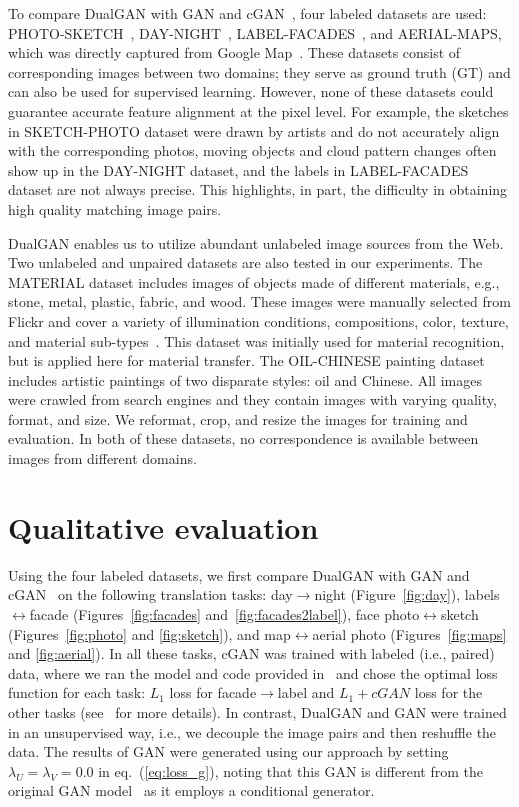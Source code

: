 To compare DualGAN with GAN and cGAN~\cite{isola2016image}, four labeled datasets are used: 
PHOTO-SKETCH~\cite{wang2009face,zhang2011coupled}, DAY-NIGHT~\cite{laffont2014transient}, 
LABEL-FACADES~\cite{tylevcek2013spatial}, and AERIAL-MAPS, which was directly captured from 
Google Map~\cite{isola2016image}. These datasets consist of corresponding images between two 
domains; they serve as ground truth (GT) and can also be used for supervised learning. However, none of these datasets could guarantee accurate feature alignment at the pixel level. For example, 
the sketches in SKETCH-PHOTO dataset were drawn by artists and do not accurately align with the 
corresponding photos, moving objects and cloud pattern changes often show up in the DAY-NIGHT dataset, 
and the labels in LABEL-FACADES dataset are not always precise. This highlights, in part, the difficulty in 
obtaining high quality matching image pairs.

DualGAN enables us to utilize abundant unlabeled image sources from the Web. Two unlabeled and 
unpaired datasets are also tested in our experiments. The MATERIAL dataset includes images of objects made of 
different materials, e.g., stone, metal, plastic, fabric, and wood. These images were manually selected from 
Flickr and cover a variety of illumination conditions, compositions, color, texture, and material 
sub-types~\cite{sharan2009material}. This dataset was initially used for material recognition, but is applied 
here for material transfer. The OIL-CHINESE painting dataset includes artistic paintings of two disparate styles: 
oil and Chinese. All images were crawled from search engines and they contain images with varying 
quality, format, and size. We reformat, crop, and resize the images for training and evaluation.
In both of these datasets, no correspondence is available between images from different domains.

\section{Qualitative evaluation}

Using the four labeled datasets, we first compare DualGAN with GAN and cGAN~\cite{isola2016image} on the 
following translation tasks: day$\rightarrow$night (Figure~\ref{fig:day}), labels$\leftrightarrow$facade 
(Figures~\ref{fig:facades} and~\ref{fig:facades2label}), face photo$\leftrightarrow$sketch (Figures~\ref{fig:photo} 
and \ref{fig:sketch}), and map$\leftrightarrow$aerial photo (Figures~\ref{fig:maps} and \ref{fig:aerial}). 
In all these tasks, cGAN was trained with labeled (i.e., paired) data, where we ran the model and code provided 
in~\cite{isola2016image} and chose the optimal loss function for each task: $L_1$ loss for facade$\rightarrow$label 
and $L_1+cGAN$ loss for the other tasks (see~\cite{isola2016image} for more details). In contrast, DualGAN and 
GAN were trained in an unsupervised way, i.e., we decouple the image pairs and then reshuffle the data. The 
results of GAN were generated using our approach by setting $\lambda_U=\lambda_V = 0.0$ in eq.~(\ref{eq:loss_g}), 
noting that this GAN is different from the original GAN model~\cite{goodfellow2014generative} as it employs a conditional 
generator.

